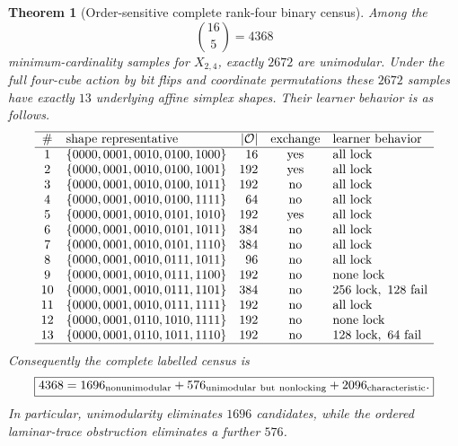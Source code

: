 \documentclass[11pt]{article}
\newtheorem{theorem}[definition]{Theorem}
\begin{document}
\begin{theorem}[Order-sensitive complete rank-four binary census]
\label{thm:rank4-complete-census}
Among the
\[
  \binom{16}{5}=4368
\]
minimum-cardinality samples for $X_{2,4}$, exactly $2672$ are unimodular.
Under the full four-cube action by bit flips and coordinate permutations these
$2672$ samples have exactly $13$ underlying affine simplex shapes.  Their
learner behavior is as follows.
\[
\begin{array}{c@{\quad}l@{\quad}r@{\quad}c@{\quad}l}
\hline
\#&\text{shape representative}&|\mathcal O|&\text{exchange}&\text{learner behavior}\\
\hline
1&\{0000,0001,0010,0100,1000\}& 16&\mathrm{yes}&\text{all lock}\\
2&\{0000,0001,0010,0100,1001\}&192&\mathrm{yes}&\text{all lock}\\
3&\{0000,0001,0010,0100,1011\}&192&\mathrm{no} &\text{all lock}\\
4&\{0000,0001,0010,0100,1111\}& 64&\mathrm{no} &\text{all lock}\\
5&\{0000,0001,0010,0101,1010\}&192&\mathrm{yes}&\text{all lock}\\
6&\{0000,0001,0010,0101,1011\}&384&\mathrm{no} &\text{all lock}\\
7&\{0000,0001,0010,0101,1110\}&384&\mathrm{no} &\text{all lock}\\
8&\{0000,0001,0010,0111,1011\}& 96&\mathrm{no} &\text{all lock}\\
9&\{0000,0001,0010,0111,1100\}&192&\mathrm{no} &\text{none lock}\\
10&\{0000,0001,0010,0111,1101\}&384&\mathrm{no}&256\text{ lock},\ 128\text{ fail}\\
11&\{0000,0001,0010,0111,1111\}&192&\mathrm{no} &\text{all lock}\\
12&\{0000,0001,0110,1010,1111\}&192&\mathrm{no} &\text{none lock}\\
13&\{0000,0001,0110,1011,1110\}&192&\mathrm{no} &128\text{ lock},\ 64\text{ fail}\\
\hline\end{array}
\]
Consequently the complete labelled census is
\[
 \boxed{
  4368
  =1696_{\rm nonunimodular}
   +576_{\rm unimodular\ but\ nonlocking}
   +2096_{\rm characteristic}.
 }
\]
In particular, unimodularity eliminates $1696$ candidates, while the ordered
laminar-trace obstruction eliminates a further $576$.
\end{theorem}
\end{document}
